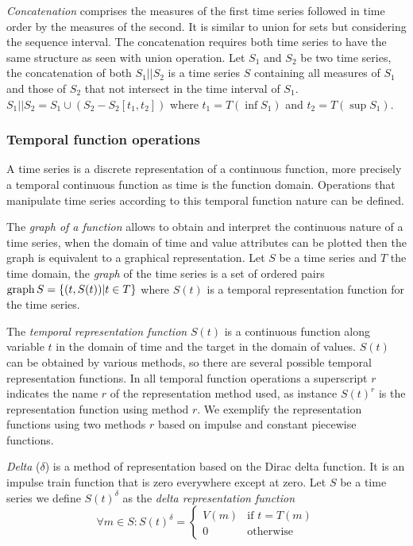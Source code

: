 \emph{Concatenation} comprises the measures of the first time series
followed in time order by the measures of the second. It is similar to
union for sets but considering the sequence interval. The
concatenation requires both time series to have the same structure as
seen with union operation.  Let $S_1$ and $S_2$ be two time series,
the concatenation of both $S_1 || S_2$ is a time series $S$ containing
all measures of $S_1$ and those of $S_2$ that not intersect in the
time interval of $S_1$.  $S_1 || S_2 = S_1 \cup ( S_2 - S_2[t_1,t_2]
)$ where $t_1=T(\inf S_1)$ and $t_2=T(\sup S_1)$.



\subsubsection{Temporal function operations}
A time series is a discrete representation of a continuous function,
more precisely a temporal continuous function as time is the function
domain. Operations that manipulate time series according to this
temporal function nature can be defined.

The \emph{graph of a function} allows to obtain and interpret the
continuous nature of a time series, when the domain of time and value
attributes can be plotted then the graph is equivalent to a graphical
representation.  Let $S$ be a time series and $T$ the time domain, the
\emph{graph} of the time series is a set of ordered pairs $\operatorname*{graph} S =
\{ (t,S(t)) | t\in T \}$ where $S(t)$ is a temporal representation
function for the time series.

The \emph{temporal representation function} $S(t)$ is a continuous
function along variable $t$ in the domain of time and the target in
the domain of values. $S(t)$ can be obtained by various methods, so
there are several possible temporal representation functions. In all
temporal function operations a superscript $r$ indicates the name $r$
of the representation method used, as instance $S(t)^r$ is the
representation function using method $r$. We exemplify the
representation functions using two methods $r$ based on impulse and
constant piecewise functions.


\begin{definition}
  \emph{Delta} ($\delta$) is a method of representation based on the
  Dirac delta function. It is an impulse train function that is zero
  everywhere except at zero.  Let $S$ be a time series we define
  $S(t)^\delta$ as the \emph{delta representation function}
\[
    \forall m \in S: S(t)^\delta
    =  \begin{cases}
      V(m) & \text{if }  t=T(m) \\
      0 & \text{otherwise}
    \end{cases}
\]
\end{definition}

